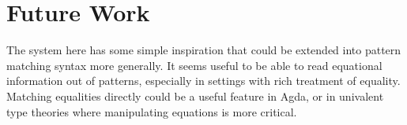 
\section{Future Work}


The system here has some simple inspiration that could be extended into pattern matching syntax more generally. 
It seems useful to be able to read equational information out of patterns, especially in settings with rich treatment of equality.
Matching equalities directly could be a useful feature in Agda, or in univalent type theories where manipulating equations is more critical.%

